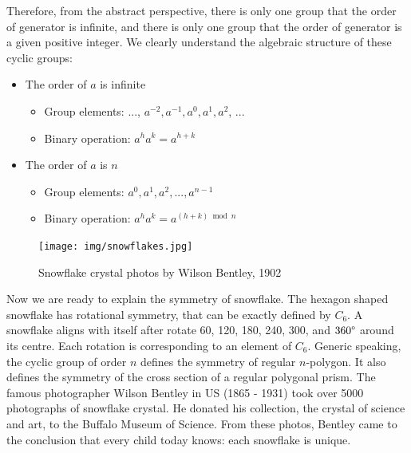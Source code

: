 \documentclass[b5paper]{article}
\begin{document}
Therefore, from the abstract perspective, there is only one group that the order of generator is infinite, and there is only one group that the order of generator is a given positive integer. We clearly understand the algebraic structure of these cyclic groups:

\begin{itemize}
\item The order of $a$ is infinite
  \begin{itemize}
  \item Group elements: ..., $a^{-2}, a^{-1}, a^0, a^1, a^2$, ...
  \item Binary operation: $a^ha^k = a^{h + k}$
  \end{itemize}
\item The order of $a$ is $n$
  \begin{itemize}
  \item Group elements: $a^0, a^1, a^2, ..., a^{n-1}$
  \item Binary operation: $a^ha^k = a^{(h + k) \bmod n}$
  \end{itemize}
\end{itemize}

\begin{figure}[htbp]
 \centering
 \texttt{[image: img/snowflakes.jpg]}
 \caption{Snowflake crystal photos by Wilson Bentley, 1902}
 \label{fig:snowflakes}
\end{figure}

Now we are ready to explain the symmetry of snowflake. The hexagon shaped snowflake has rotational symmetry, that can be exactly defined by $C_6$. A snowflake aligns with itself after rotate 60\degree, 120\degree, 180\degree, 240\degree, 300\degree, and $360\degree$ around its centre. Each rotation is corresponding to an element of $C_6$. Generic speaking, the cyclic group of order $n$ defines the symmetry of regular $n$-polygon. It also defines the symmetry of the cross section of a regular polygonal prism. The famous photographer Wilson Bentley in US (1865 - 1931) took over 5000 photographs of snowflake crystal. He donated his collection, the crystal of science and art, to the Buffalo Museum of Science. From these photos, Bentley came to the conclusion that every child today knows: each snowflake is unique.

\begin{Exercise}
\end{Exercise}
\end{document}
